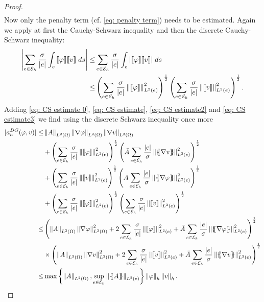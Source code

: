 \begin{proof}
\begin{align}
	\end{align}
	Now only the penalty term (cf. \eqref{eq: penalty term}) needs to be estimated. Again we apply at first the Cauchy-Schwarz inequality and then the discrete Cauchy-Schwarz inequality:
	\begin{align}
	\left| \sum_{e \in \mathcal{E}_h} \frac \sigma {|e|} \int_{e} {{\llbracket \varphi \rrbracket \llbracket v \rrbracket }\;ds} \right|
	\leq& \sum_{e \in \mathcal{E}_h} \frac \sigma  {|e|} \int_{e} {{ \left| \llbracket \varphi \rrbracket \llbracket v \rrbracket  \right|}\;ds} \nonumber \\
	\leq& \left( \sum\limits_{e \in \mathcal{E}_h} \frac \sigma{|e|} \left\lVert \llbracket \varphi \rrbracket \right\rVert_{L^2(e)}^2 \right)^{\frac 1 2} \left( \sum\limits_{e \in \mathcal{E}_h} \frac \sigma {|e|} \left\lVert \llbracket v \rrbracket \right\rVert_{L^2(e)}^2 \right)^{\frac 1 2}. \label{eq: CS estimate3}
	\end{align}
	Adding \eqref{eq: CS estimate 0}, \eqref{eq: CS estimate}, \eqref{eq: CS estimate2} and \eqref{eq: CS estimate3} we find using the discrete Schwarz inequality once more
	\begin{align}
	|a_h^{DG}(\varphi,v)| \leq& 
	 \LTwonorm{A} \LTwonorm {\nabla \varphi} \LTwonorm{\nabla v} \nonumber\\
	& +\left( \sum\limits_{e \in \edges}\frac {\sigma}{|e|}\LTwonormE{\jump {\varphi}}^2 \right)^{\frac 1 2}
	\left( \bar A \sum\limits_{e \in \edges} \frac {|e|} \sigma \LTwonormE{\average{\nabla v}}^2 \right)^{\frac 1 2} \nonumber\\
	& +	\left( \sum\limits_{e \in \edges} \frac {\sigma} {|e|}\LTwonormE{\jump {v}}^2 \right)^{\frac 1 2}
	\left( \bar A \sum\limits_{e \in \edges} \frac {|e|} \sigma \LTwonormE{\average{\nabla \varphi}}^2 \right)^{\frac 1 2}\nonumber \\
	& + \left( \sum\limits_{e \in \edges} \frac \sigma{|e|} \LTwonormE{\jump{\varphi}}^2 \right)^{\frac 1 2} \left( \sum\limits_{e \in \edges} \frac \sigma {|e|} \LTwonormE{\jump{v}}^2 \right)^{\frac 1 2} \nonumber \\
	\leq& 
	\left( 
	\LTwonorm{A}\LTwonorm{\nabla \varphi}^2+2\sum\limits_{e \in \edges} \frac {\sigma} {|e|}\LTwonormE{\jump {\varphi}}^2+ \bar A\sum\limits_{e \in \edges} \frac {|e|} \sigma \LTwonormE{\average{\nabla \varphi}}^2
	\right)^{\frac 1 2} \nonumber \\
	&\times
	\left( 
	\LTwonorm{A} \LTwonorm{\nabla v}^2+2\sum\limits_{e \in \edges} \frac {\sigma}{|e|}\LTwonormE{\jump {v}}^2+ \bar A\sum\limits_{e \in \edges} \frac {|e|} \sigma \LTwonormE{\average{\nabla v}}^2
	\right) ^{\frac 1 2} \nonumber \\
	\leq & \max {\LTwonorm{A}} {\sup_{e \in \edges }\LTwonormE{\average A}} \eNorm \varphi \eNorm v.   \label{eq: exact estimate boundedness} %
	\end{align}
	\phantom{blub}
\end{proof}


